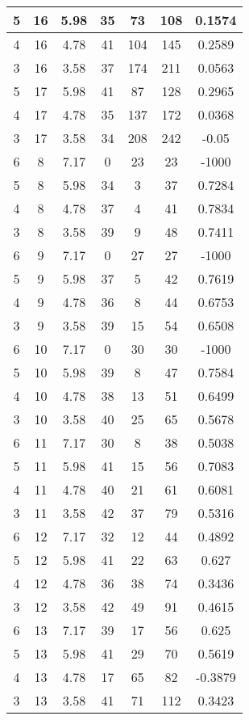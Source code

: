 \documentclass[letterpaper, 12pt]{article}
\begin{document}
\begin{longtable}{|c|c|c|c|c|c|c|}
\hline
5 & 16 & 5.98 & 35 & 73 & 108 & 0.1574 \\
\hline
4 & 16 & 4.78 & 41 & 104 & 145 & 0.2589 \\
\hline
3 & 16 & 3.58 & 37 & 174 & 211 & 0.0563 \\
\hline
5 & 17 & 5.98 & 41 & 87 & 128 & 0.2965 \\
\hline
4 & 17 & 4.78 & 35 & 137 & 172 & 0.0368 \\
\hline
3 & 17 & 3.58 & 34 & 208 & 242 & -0.05 \\
\hline
6 & 8 & 7.17 & 0 & 23 & 23 & -1000 \\
\hline
5 & 8 & 5.98 & 34 & 3 & 37 & 0.7284 \\
\hline
4 & 8 & 4.78 & 37 & 4 & 41 & 0.7834 \\
\hline
3 & 8 & 3.58 & 39 & 9 & 48 & 0.7411 \\
\hline
6 & 9 & 7.17 & 0 & 27 & 27 & -1000 \\
\hline
5 & 9 & 5.98 & 37 & 5 & 42 & 0.7619 \\
\hline
4 & 9 & 4.78 & 36 & 8 & 44 & 0.6753 \\
\hline
3 & 9 & 3.58 & 39 & 15 & 54 & 0.6508 \\
\hline
6 & 10 & 7.17 & 0 & 30 & 30 & -1000 \\
\hline
5 & 10 & 5.98 & 39 & 8 & 47 & 0.7584 \\
\hline
4 & 10 & 4.78 & 38 & 13 & 51 & 0.6499 \\
\hline
3 & 10 & 3.58 & 40 & 25 & 65 & 0.5678 \\
\hline
6 & 11 & 7.17 & 30 & 8 & 38 & 0.5038 \\
\hline
5 & 11 & 5.98 & 41 & 15 & 56 & 0.7083 \\
\hline
4 & 11 & 4.78 & 40 & 21 & 61 & 0.6081 \\
\hline
3 & 11 & 3.58 & 42 & 37 & 79 & 0.5316 \\
\hline
6 & 12 & 7.17 & 32 & 12 & 44 & 0.4892 \\
\hline
5 & 12 & 5.98 & 41 & 22 & 63 & 0.627 \\
\hline
4 & 12 & 4.78 & 36 & 38 & 74 & 0.3436 \\
\hline
3 & 12 & 3.58 & 42 & 49 & 91 & 0.4615 \\
\hline
6 & 13 & 7.17 & 39 & 17 & 56 & 0.625 \\
\hline
5 & 13 & 5.98 & 41 & 29 & 70 & 0.5619 \\
\hline
4 & 13 & 4.78 & 17 & 65 & 82 & -0.3879 \\
\hline
3 & 13 & 3.58 & 41 & 71 & 112 & 0.3423 \\

\end{longtable}
\end{document}
